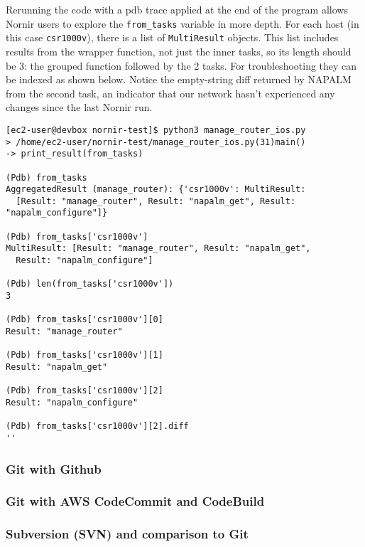 Rerunning the code with a pdb trace applied at the end of the program allows
Nornir users to explore the \verb|from_tasks| variable in more depth. For each
host (in this case \verb|csr1000v|), there is a list of \verb|MultiResult| objects.
This list includes results from the wrapper function, not just the inner tasks, so
its length should be 3: the grouped function followed by the 2 tasks. For
troubleshooting they can be indexed as shown below. Notice the empty-string
diff returned by NAPALM from the second task, an indicator that our network
hasn't experienced any changes since the last Nornir run.

\begin{verbatim}
[ec2-user@devbox nornir-test]$ python3 manage_router_ios.py
> /home/ec2-user/nornir-test/manage_router_ios.py(31)main()
-> print_result(from_tasks)

(Pdb) from_tasks
AggregatedResult (manage_router): {'csr1000v': MultiResult:
  [Result: "manage_router", Result: "napalm_get", Result: "napalm_configure"]}

(Pdb) from_tasks['csr1000v']
MultiResult: [Result: "manage_router", Result: "napalm_get",
  Result: "napalm_configure"]

(Pdb) len(from_tasks['csr1000v'])
3

(Pdb) from_tasks['csr1000v'][0]
Result: "manage_router"

(Pdb) from_tasks['csr1000v'][1]
Result: "napalm_get"

(Pdb) from_tasks['csr1000v'][2]
Result: "napalm_configure"

(Pdb) from_tasks['csr1000v'][2].diff
''
\end{verbatim}

\subsubsection{Git with Github}
\subsubsection{Git with AWS CodeCommit and CodeBuild}
\subsubsection{Subversion (SVN) and comparison to Git}

